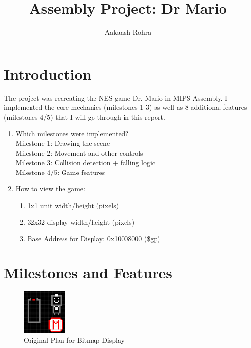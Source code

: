 \documentclass{article}
\title{Assembly Project: Dr Mario}
\author{Aakaash Rohra}
\begin{document}
\maketitle

\section{Introduction}
The project was recreating the NES game Dr. Mario in MIPS Assembly. I implemented the core mechanics (milestones 1-3) as well as 8 additional features (milestones 4/5) that I will go through in this report.
\begin{enumerate}
    \item Which milestones were implemented? \\
    Milestone 1: Drawing the scene \\ Milestone 2: Movement and other controls \\ Milestone 3: Collision detection + falling logic \\ Milestone 4/5: Game features
    \item How to view the game:
    \begin{enumerate}
    \item 1x1 unit width/height (pixels)
    \item 32x32 display width/height (pixels)
    \item Base Address for Display: 0x10008000 (\$gp)
    \end{enumerate}
\end{enumerate}

\section{Milestones and Features}
\begin{figure}[ht!]
    \centering
    \includegraphics[width=0.2\textwidth]{plan.png}
    \caption{Original Plan for Bitmap Display}
    \label{Instructions}
\end{figure}
\end{document}
